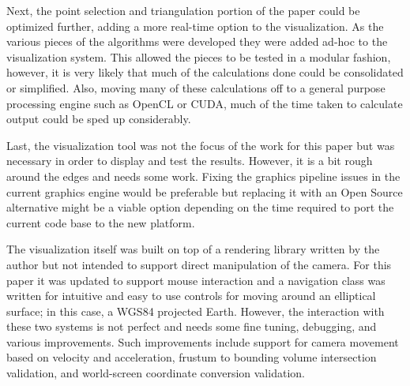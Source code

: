 Next, the point selection and triangulation portion of the paper could be
optimized further, adding a more real-time option to the visualization. As the
various pieces of the algorithms were developed they were added ad-hoc to the
visualization system. This allowed the pieces to be tested in a modular fashion,
however, it is very likely that much of the calculations done could be
consolidated or simplified. Also, moving many of these calculations off to a
general purpose processing engine such as OpenCL or CUDA, much of the time taken
to calculate output could be sped up considerably.

Last, the visualization tool was not the focus of the work for this paper but
was necessary in order to display and test the results. However, it is a bit
rough around the edges and needs some work. Fixing the graphics pipeline issues
in the current graphics engine would be preferable but replacing it with an Open
Source alternative might be a viable option depending on the time required to
port the current code base to the new platform.

The visualization itself was built on top of a rendering library written by the
author but not intended to support direct manipulation of the camera. For this
paper it was updated to support mouse interaction and a navigation class was
written for intuitive and easy to use controls for moving around an elliptical
surface; in this case, a WGS84 projected Earth. However, the interaction with
these two systems is not perfect and needs some fine tuning, debugging, and
various improvements. Such improvements include support for camera movement
based on velocity and acceleration, frustum to bounding volume intersection
validation, and world-screen coordinate conversion validation.